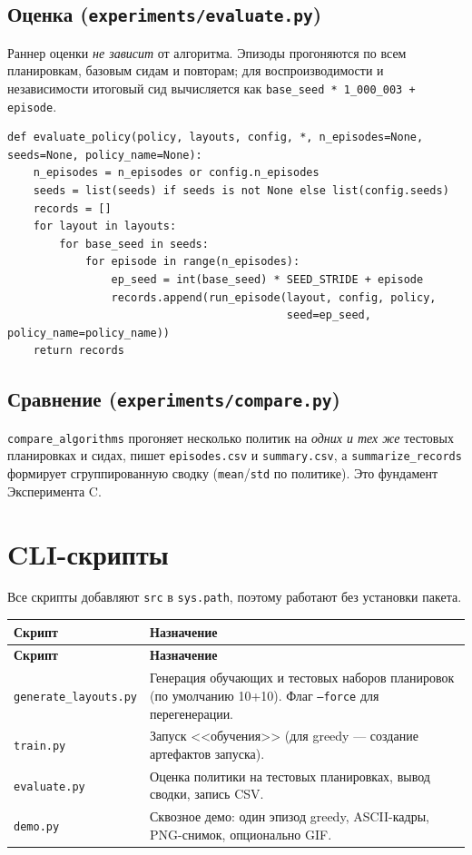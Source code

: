 \documentclass[11pt,a4paper]{article}
\newcommand{\code}[1]{\texttt{#1}}
\begin{document}
\subsection{Оценка (\code{experiments/evaluate.py})}
Раннер оценки \emph{не зависит} от алгоритма. Эпизоды прогоняются по всем
планировкам, базовым сидам и повторам; для воспроизводимости и независимости
итоговый сид вычисляется как \code{base\_seed * 1\_000\_003 + episode}.

\begin{lstlisting}[style=py]
def evaluate_policy(policy, layouts, config, *, n_episodes=None, seeds=None, policy_name=None):
    n_episodes = n_episodes or config.n_episodes
    seeds = list(seeds) if seeds is not None else list(config.seeds)
    records = []
    for layout in layouts:
        for base_seed in seeds:
            for episode in range(n_episodes):
                ep_seed = int(base_seed) * SEED_STRIDE + episode
                records.append(run_episode(layout, config, policy,
                                           seed=ep_seed, policy_name=policy_name))
    return records
\end{lstlisting}

\subsection{Сравнение (\code{experiments/compare.py})}
\code{compare\_algorithms} прогоняет несколько политик на \emph{одних и тех же}
тестовых планировках и сидах, пишет \code{episodes.csv} и \code{summary.csv}, а
\code{summarize\_records} формирует сгруппированную сводку
(\code{mean}/\code{std} по политике). Это фундамент Эксперимента C.

\section{CLI-скрипты}
Все скрипты добавляют \code{src} в \code{sys.path}, поэтому работают без
установки пакета.

\begin{longtable}{@{}p{}p{}@{}}
\toprule
\textbf{Скрипт} & \textbf{Назначение} \\
\midrule
\endfirsthead
\toprule
\textbf{Скрипт} & \textbf{Назначение} \\
\midrule
\endhead
\code{generate\_layouts.py} & Генерация обучающих и тестовых наборов планировок
(по умолчанию 10+10). Флаг \code{--force} для перегенерации. \\
\code{train.py} & Запуск <<обучения>> (для greedy — создание артефактов запуска). \\
\code{evaluate.py} & Оценка политики на тестовых планировках, вывод сводки,
запись CSV. \\
\code{demo.py} & Сквозное демо: один эпизод greedy, ASCII-кадры, PNG-снимок,
опционально GIF. \\
\bottomrule
\end{longtable}
\end{document}
